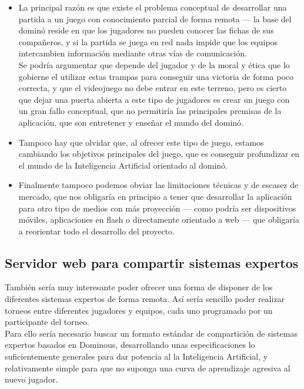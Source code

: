 \begin{itemize}
    \item La principal razón es que existe el problema conceptual de desarrollar una partida a un juego con conocimiento parcial 
        de forma remota --- la base del dominó reside en que los jugadores no pueden conocer las fichas de sus compañeros,
        y si la partida se juega en red nada impide que los equipos intercambien información mediante otras vías de
        comunicación. \\
        Se podría argumentar que depende del jugador y de la moral y ética que lo gobierne el utilizar estas trampas
        para conseguir una victoria de forma poco correcta, y que el videojuego no debe entrar en este terreno, pero
        es cierto que dejar una puerta abierta a este tipo de jugadores es crear un juego con un gran fallo conceptual,
        que no permitiría las principales premisas de la aplicación, que son entretener y enseñar el mundo del dominó.

    \item Tampoco hay que olvidar que, al ofrecer este tipo de juego, estamos cambiando los objetivos principales del
        juego, que es conseguir profundizar en el mundo de la Inteligencia Artificial orientado al dominó.

    \item Finalmente tampoco podemos obviar las limitaciones técnicas y de escasez de mercado, que nos obligaría en
        principio a tener que desarrollar la aplicación para otro tipo de medios con más proyección --- como podría
        ser dispositivos móviles, aplicaciones en flash o directamente orientado a web --- que obligaría a reorientar
        todo el desarrollo del proyecto.
\end{itemize}

\subsection{Servidor web para compartir sistemas expertos}

También sería muy interesante poder ofrecer una forma de disponer de los diferentes sistemas expertos de forma remota.
Así sería sencillo poder realizar torneos entre diferentes jugadores y equipos, cada uno programado por un participante
del torneo. \\

Para ello sería necesario buscar un formato estándar de compartición de sistemas expertos basados en Dominous, desarrollando
unas especificaciones lo suficientemente generales para dar potencia al la Inteligencia Artificial, y relativamente
simple para que no suponga una curva de aprendizaje agresiva al nuevo jugador. \\

